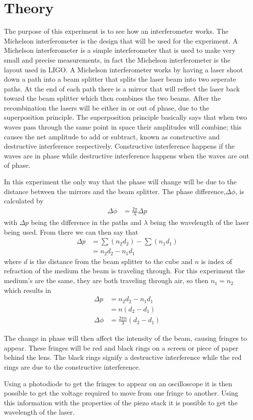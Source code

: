 \section{Theory}

The purpose of this experiment is to see how an interferometer works. The Michelson interferometer is the design that will be used for the experiment. A Michelson interferometer is a simple interferometer that is used to make very small and precise measurements, in fact the Michelson interferometer is the layout used in LIGO. A Michelson interferometer works by having a laser shoot down a path into a beam splitter that splits the laser beam into two seperate paths. At the end of each path there is a mirror that will reflect the laser back toward the beam splitter which then combines the two beams. After the recombination the lasers will be either in or out of phase, due to the superposition principle. The superposition principle basically says that when two waves pass through the same point in space their amplitudes will combine; this causes the net amplitude to add or subtract, known as constructive and destructive interference respectively. Constructive interference happens if the waves are in phase while destructive interference happens when the waves are out of phase.

In this experiment the only way that the phase will change will be due to the distance between the mirrors and the beam splitter. The phase difference,$\Delta \phi$, is calculated by 
	\begin{align}
		\nonumber \Delta \phi &=\frac{2\pi}{\lambda} \Delta p
	\end{align}
with $\Delta p$ being the difference in the paths and $\lambda$ being the wavelength of the laser being used. From there we can then say that 
	\begin{align}
		\nonumber \Delta p &=\sum(n_2 d_2)-\sum(n_1 d_1) \\
		\nonumber		&=n_2 d_2 - n_1 d_1
	\end{align} 
where $d$ is the distance from the beam splitter to the cube and $n$ is index of refraction of the medium the beam is traveling through. For this experiment the medium's are the same, they are both traveling through air, so then $n_1=n_2$ which results in
	\begin{align}
		\nonumber \Delta p &= n_2 d_2 - n_1 d_1 \\
		\nonumber 	&= n(d_2 - d_1) \\
		\nonumber \Delta \phi &=\frac{2\pi n}{\lambda} (d_2 - d_1)
	\end{align}

The change in phase will then affect the intensity of the beam, causing fringes to appear. These fringes will be red and black rings on a screen or piece of paper behind the lens. The black rings signify a destructive interference while the red rings are due to the constructive interference. 

Using a photodiode to get the fringes to appear on an oscilloscope it is then possible to get the voltage required to move from one fringe to another. Using this information with the properties of the piezo stack it is possible to get the wavelength of the laser. 


